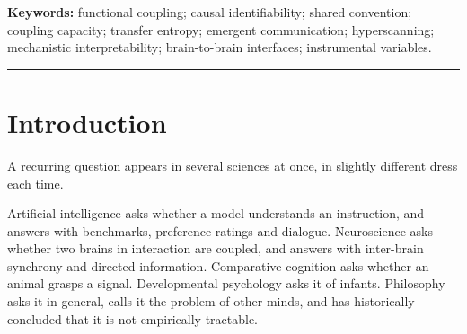 \documentclass[11pt,a4paper]{article}
\theoremstyle{plain}
\theoremstyle{definition}
\theoremstyle{remark}
\begin{document}
\begin{abstract}
We then characterise what does suffice. Functional coupling is identified by adjustment
when the shared convention is observed, by instrumental variation --- for which, we note,
ordinary channel noise qualifies, inverting the usual impulse to denoise --- or by direct
intervention. Two things notably do not suffice: temporal precedence, so that transfer
entropy and Granger causality inherit the full force of the negative result despite being
called directional; and observation of the receiver's internal state, which fails the
front-door criterion for structural reasons that no gain in recording resolution or
interpretability precision can repair. We conclude that functional coupling is an
\emph{interventional} quantity sitting one rung above where it is currently measured, and
that this, rather than any deep obscurity in the phenomenon, is why debates about machine
understanding do not resolve. We derive consequences for AI evaluation, mechanistic
interpretability and hyperscanning, note that the framework retrodicts the decade-long
stagnation of brain-to-brain interface bandwidth, and close with the open questions that
would decide the account.
\end{abstract}

\vspace{2pt}
\noindent\textbf{Keywords:} functional coupling; causal identifiability; shared convention;
coupling capacity; transfer entropy; emergent communication; hyperscanning; mechanistic
interpretability; brain-to-brain interfaces; instrumental variables.

\vspace{4pt}
\noindent\rule{\textwidth}{0.4pt}

\section{Introduction}\label{sec:intro}

A recurring question appears in several sciences at once, in slightly different dress each
time.

Artificial intelligence asks whether a model understands an instruction, and answers with
benchmarks, preference ratings and dialogue. Neuroscience asks whether two brains in
interaction are coupled, and answers with inter-brain synchrony and directed information.
Comparative cognition asks whether an animal grasps a signal. Developmental psychology asks
it of infants. Philosophy asks it in general, calls it the problem of other minds, and has
historically concluded that it is not empirically tractable.
\end{document}
